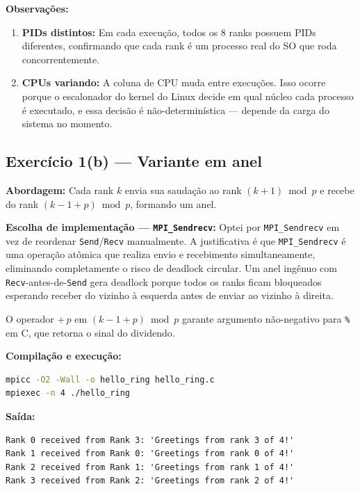 \documentclass[10pt,small,a4paper]{article}
\begin{document}
\textbf{Observações:}
\begin{enumerate}
    \item \textbf{PIDs distintos:} Em cada execução, todos os 8 ranks possuem PIDs
    diferentes, confirmando que cada rank é um processo real do SO que roda
    concorrentemente.
    \item \textbf{CPUs variando:} A coluna de CPU muda entre execuções. Isso ocorre
    porque o escalonador do kernel do Linux decide em qual núcleo cada processo é
    executado, e essa decisão é não-determinística — depende da carga do sistema
    no momento.
\end{enumerate}

\subsection{Exercício 1(b) — Variante em anel}

\textbf{Abordagem:} Cada rank $k$ envia sua saudação ao rank $(k+1) \bmod p$ e recebe
do rank $(k-1+p) \bmod p$, formando um anel.

\textbf{Escolha de implementação — \texttt{MPI\_Sendrecv}:}
Optei por \texttt{MPI\_Sendrecv} em vez de reordenar \texttt{Send}/\texttt{Recv}
manualmente. A justificativa é que \texttt{MPI\_Sendrecv} é uma operação atômica que
realiza envio e recebimento simultaneamente, eliminando completamente o risco de
deadlock circular. Um anel ingênuo com \texttt{Recv}-antes-de-\texttt{Send} gera
deadlock porque todos os ranks ficam bloqueados esperando receber do vizinho à
esquerda antes de enviar ao vizinho à direita.

O operador $+\,p$ em $(k - 1 + p) \bmod p$ garante argumento não-negativo para
\texttt{\%} em C, que retorna o sinal do dividendo.

\textbf{Compilação e execução:}
\begin{lstlisting}[language=bash,numbers=none]
mpicc -O2 -Wall -o hello_ring hello_ring.c
mpiexec -n 4 ./hello_ring
\end{lstlisting}

\textbf{Saída:}
\begin{lstlisting}[language={},numbers=none]
Rank 0 received from Rank 3: 'Greetings from rank 3 of 4!'
Rank 1 received from Rank 0: 'Greetings from rank 0 of 4!'
Rank 2 received from Rank 1: 'Greetings from rank 1 of 4!'
Rank 3 received from Rank 2: 'Greetings from rank 2 of 4!'
\end{lstlisting}

\end{document}

